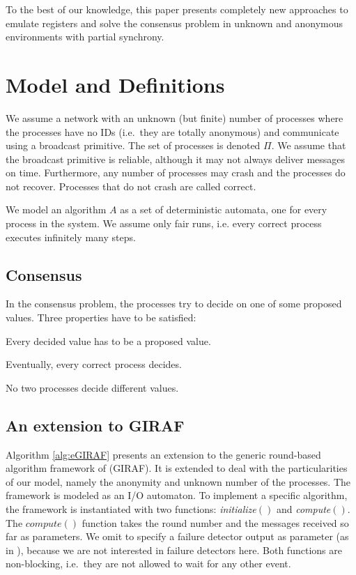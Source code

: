 \documentclass[conference, compsoc]{IEEEtran}
\def\initialize{\textit{initialize}}
\def\compute{\textit{compute}}
\begin{document}
To the best of our knowledge, this paper presents completely new approaches to emulate registers and solve the consensus problem in unknown and anonymous environments with partial synchrony.  



\section{Model and Definitions}

We assume a network with an unknown (but finite) number of processes where the processes have no IDs (i.e.~they are totally anonymous) and communicate using a broadcast primitive. The set of processes is denoted $\Pi$. We assume that the broadcast primitive is reliable, although it may not always deliver messages on time. Furthermore, any number of processes may crash and the processes do not recover. Processes that do not crash are called correct.

We model an algorithm $A$ as a set of deterministic automata, one for every process in the system. We assume only fair runs, i.e. every correct process executes infinitely many steps.    

\subsection{Consensus}
 
In the consensus problem, the processes try to decide on one of some proposed values. Three properties have to be satisfied:
\begin{description} 
 \item[Validity:] Every decided value has to be a proposed value.
 \item[Termination:] Eventually, every correct process decides.
 \item[Agreement:] No two processes decide different values.
\end{description} 

 
\subsection{An extension to GIRAF}

Algorithm \ref{alg:eGIRAF} presents an extension to the generic round-based algorithm framework of \cite{1449454} (GIRAF). It is extended to deal with the particularities of our model, namely the anonymity and unknown number of the processes. The framework is modeled as an I/O automaton. To implement a specific algorithm, the framework is instantiated with two functions: \initialize$()$ and \compute$()$. The $\compute()$ function takes the round number and the messages received so far as parameters. We omit to specify a failure detector output as parameter (as in \cite{1449454}), because we are not interested in failure detectors here. Both functions are non-blocking, i.e.~they are not allowed to wait for any 
other event. 
\end{document}
